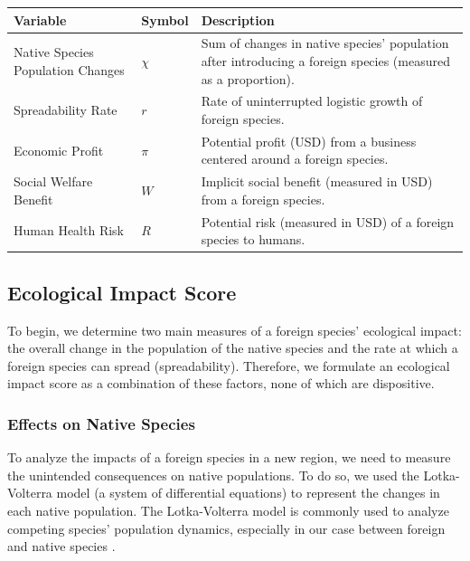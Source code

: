 \begin{table}[h]
\renewcommand{\arraystretch}{1.3}
    \begin{tabularx}{\textwidth}{p{}lX}
    \toprule
    \textbf{Variable}           & \textbf{Symbol} & \textbf{Description}  \\ \midrule
    \raggedright Native Species Population Changes & $\chi$  & Sum of changes in native species' population after introducing a foreign species (measured as a proportion). \\
    \rowcolor{gray!15}
    \raggedright Spreadability Rate  & $r$  & Rate of uninterrupted logistic growth of foreign species.\\
    Economic Profit & $\pi$  & Potential profit (USD) from a business centered around a foreign species. \\
    \rowcolor{gray!15} \raggedright Social Welfare Benefit& $W$   & Implicit social benefit (measured in USD) from a foreign species. \\
    \raggedright Human Health Risk & $R$ & Potential risk (measured in USD) of a foreign species to humans.\\
    \bottomrule
    \end{tabularx}
\end{table}

\subsection{Ecological Impact Score}

To begin, we determine two main measures of a foreign species' ecological impact: the overall change in the population of the native species and the rate at which a foreign species can spread (spreadability). Therefore, we formulate an ecological impact score as a combination of these factors, none of which are dispositive. 

\subsubsection{Effects on Native Species}

To analyze the impacts of a foreign species in a new region, we need to measure the unintended consequences on native populations. To do so, we used the Lotka-Volterra model (a system of differential equations) to represent the changes in each native population. The Lotka-Volterra model is commonly used to analyze competing species' population dynamics, especially in our case between foreign and native species \cite{noauthor_lotka-volterra_nodate}. 

